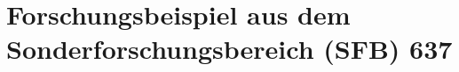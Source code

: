 \section{Forschungsbeispiel aus dem Sonderforschungsbereich (SFB) 637}
\label{sec:Forschungsbeispiel}



